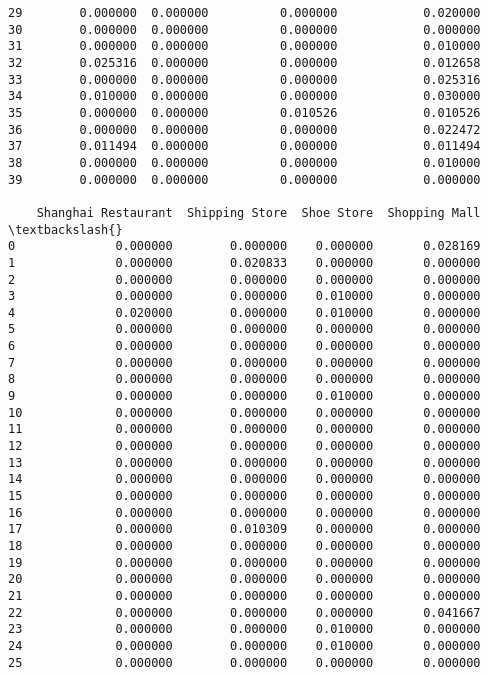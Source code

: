 \documentclass[11pt]{article}
\begin{document}
\begin{tcolorbox}[breakable, size=fbox, boxrule=.5pt, pad at break*=1mm, opacityfill=0]
\begin{Verbatim}[commandchars=\\\{\}]
29        0.000000  0.000000          0.000000            0.020000
30        0.000000  0.000000          0.000000            0.000000
31        0.000000  0.000000          0.000000            0.010000
32        0.025316  0.000000          0.000000            0.012658
33        0.000000  0.000000          0.000000            0.025316
34        0.010000  0.000000          0.000000            0.030000
35        0.000000  0.000000          0.010526            0.010526
36        0.000000  0.000000          0.000000            0.022472
37        0.011494  0.000000          0.000000            0.011494
38        0.000000  0.000000          0.000000            0.010000
39        0.000000  0.000000          0.000000            0.000000

    Shanghai Restaurant  Shipping Store  Shoe Store  Shopping Mall  \textbackslash{}
0              0.000000        0.000000    0.000000       0.028169
1              0.000000        0.020833    0.000000       0.000000
2              0.000000        0.000000    0.000000       0.000000
3              0.000000        0.000000    0.010000       0.000000
4              0.020000        0.000000    0.010000       0.000000
5              0.000000        0.000000    0.000000       0.000000
6              0.000000        0.000000    0.000000       0.000000
7              0.000000        0.000000    0.000000       0.000000
8              0.000000        0.000000    0.000000       0.000000
9              0.000000        0.000000    0.010000       0.000000
10             0.000000        0.000000    0.000000       0.000000
11             0.000000        0.000000    0.000000       0.000000
12             0.000000        0.000000    0.000000       0.000000
13             0.000000        0.000000    0.000000       0.000000
14             0.000000        0.000000    0.000000       0.000000
15             0.000000        0.000000    0.000000       0.000000
16             0.000000        0.000000    0.000000       0.000000
17             0.000000        0.010309    0.000000       0.000000
18             0.000000        0.000000    0.000000       0.000000
19             0.000000        0.000000    0.000000       0.000000
20             0.000000        0.000000    0.000000       0.000000
21             0.000000        0.000000    0.000000       0.000000
22             0.000000        0.000000    0.000000       0.041667
23             0.000000        0.000000    0.010000       0.000000
24             0.000000        0.000000    0.010000       0.000000
25             0.000000        0.000000    0.000000       0.000000

\end{Verbatim}
\end{tcolorbox}
\end{document}
